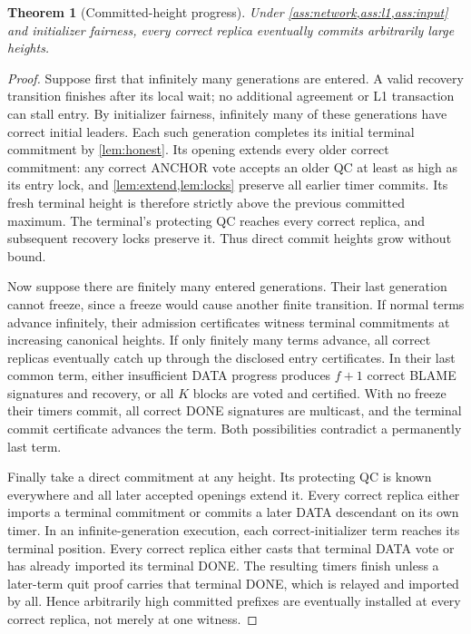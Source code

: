\documentclass[11pt,a4paper]{article}
\newtheorem{theorem}[theorem]{Theorem}
\begin{document}
\begin{theorem}[Committed-height progress]
\label{thm:height}
Under \cref{ass:network,ass:l1,ass:input} and initializer fairness,
every correct replica eventually commits arbitrarily large heights.
\end{theorem}
\begin{proof}
Suppose first that infinitely many generations are entered. A valid
recovery transition finishes after its local wait; no additional agreement
or L1 transaction can stall entry. By initializer fairness, infinitely
many of these generations have correct initial leaders. Each such
generation completes its initial terminal commitment by
\cref{lem:honest}. Its opening extends every older correct commitment:
any correct ANCHOR vote accepts an older QC at least as high as its
entry lock, and \cref{lem:extend,lem:locks} preserve all earlier timer
commits. Its fresh terminal height is therefore strictly above the
previous committed maximum. The terminal's protecting QC reaches every
correct replica, and subsequent recovery locks preserve it. Thus direct
commit heights grow without bound.

Now suppose there are finitely many entered generations. Their last
generation cannot freeze, since a freeze would cause another finite
transition. If normal terms advance infinitely, their admission
certificates witness terminal commitments at increasing canonical heights.
If only finitely many terms advance, all correct replicas eventually
catch up through the disclosed entry certificates. In their last common
term, either insufficient DATA progress produces $f+1$ correct BLAME
signatures and recovery, or all $K$ blocks are voted and certified.
With no freeze their timers commit, all correct DONE signatures are
multicast, and the terminal commit certificate advances the term. Both
possibilities contradict a permanently last term.

Finally take a direct commitment at any height. Its protecting QC is
known everywhere and all later accepted openings extend it. Every
correct replica either imports a terminal commitment or commits a later
DATA descendant on its own timer. In an infinite-generation execution,
each correct-initializer term reaches its terminal position. Every correct
replica either casts that terminal DATA vote or has already imported its
terminal DONE. The resulting timers finish unless a later-term quit proof
carries that terminal DONE, which is relayed and imported by all. Hence
arbitrarily high committed prefixes are eventually
installed at every correct replica, not merely at one witness.
\end{proof}
\end{document}

